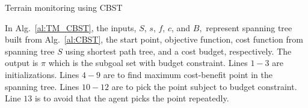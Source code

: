 \begin{algorithm}[thbp]
    \caption{Terrain monitoring using CBST}
    \begin{algorithmic}[1]
    \State {$\pi:=\phi$}
        \ENDFOR
        \ENDIF
    \ENDWHILE
    \end{algorithmic}
    \label{al:TM_CBST}
\end{algorithm}

In Alg.~\ref{al:TM_CBST}, the inputs, $S$, $s$, $f$, $c$, and $B,$ represent spanning tree built from Alg.~\ref{al:CBST}, the start point, objective function, cost function from spanning tree $S$ using shortest path tree, and a cost budget, respectively.
The output is $\pi$ which is the subgoal set with budget constraint.
Lines $1-3$ are initializations.
Lines $4-9$ are to find maximum cost-benefit point in the spanning tree.
Lines $10-12$ are to pick the point subject to budget constraint.
Line $13$ is to avoid that the agent pick{\color{olive}s} the point repeatedly.